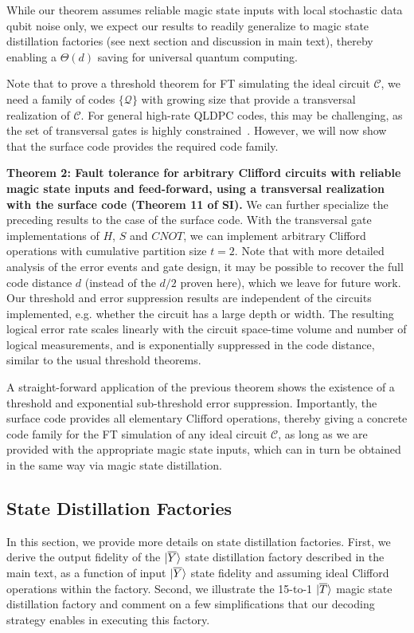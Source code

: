 While our theorem assumes reliable magic state inputs with local stochastic data qubit noise only, we expect our results to readily generalize to magic state distillation factories (see next section and discussion in main text), thereby enabling a $\Theta(d)$ saving for universal quantum computing.

Note that to prove a threshold theorem for FT simulating the ideal circuit $\mathcal{C}$, we need a family of codes $\{\mathcal{Q}\}$ with growing size that provide a transversal realization of $\mathcal{C}$.
%
For general high-rate QLDPC codes, this may be challenging, as the set of transversal gates is highly constrained~\cite{breuckmann2024fold,quintavalle2023partitioning}.
%
However, we will now show that the surface code provides the required code family.

\textbf{Theorem 2: Fault tolerance for arbitrary Clifford circuits with reliable magic state inputs and feed-forward, using a transversal realization with the surface code (Theorem 11 of SI).}
%
We can further specialize the preceding results to the case of the surface code.
%
With the transversal gate implementations of $H$, $S$ and $CNOT$, we can implement arbitrary Clifford operations with cumulative partition size $t=2$.
%
Note that with more detailed analysis of the error events and gate design, it may be possible to recover the full code distance $d$ (instead of the $d/2$ proven here), which we leave for future work.
%
Our threshold and error suppression results are independent of the circuits implemented, e.g. whether the circuit has a large depth or width.
%
The resulting logical error rate scales linearly with the circuit space-time volume and number of logical measurements, and is exponentially suppressed in the code distance, similar to the usual threshold theorems.

A straight-forward application of the previous theorem shows the existence of a threshold and exponential sub-threshold error suppression.
%
Importantly, the surface code provides all elementary Clifford operations, thereby giving a concrete code family for the FT simulation of any ideal circuit $\mathcal{C}$, as long as we are provided with the appropriate magic state inputs, which can in turn be obtained in the same way via magic state distillation.

\subsection{State Distillation Factories}
In this section, we provide more details on state distillation factories.
%
First, we derive the output fidelity of the $|{\overline{Y}}\rangle$ state distillation factory described in the main text, as a function of input $|{\overline{Y}}\rangle$ state fidelity and assuming ideal Clifford operations within the factory.
%
Second, we illustrate the 15-to-1 $|{\overline{T}}\rangle$ magic state distillation factory and comment on a few simplifications that our decoding strategy enables in executing this factory.


